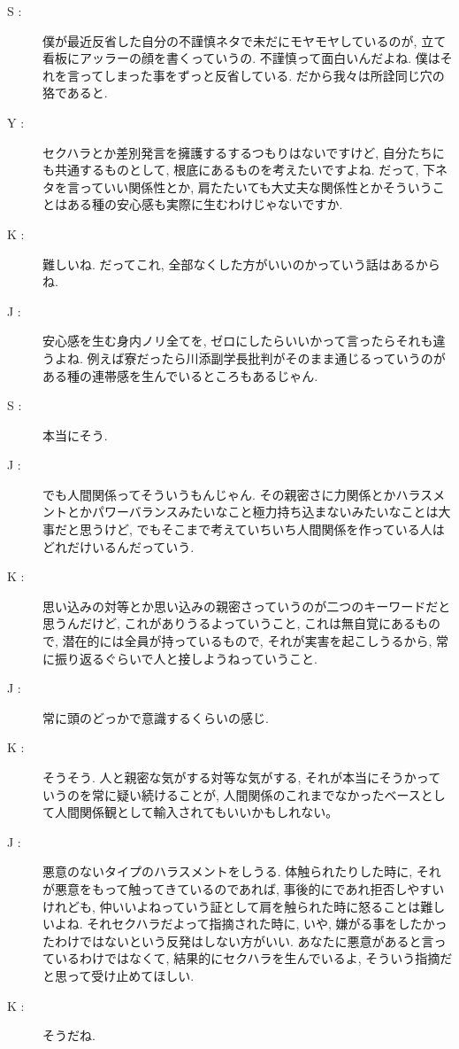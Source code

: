 \documentclass[10pt,b5jsbook,dvips,dvipdfmx,openany]{jsbook}
\theoremstyle{definition}
\begin{document}
\begin{multicols}{2}
\begin{description}
		\item[ S : ] 僕が最近反省した自分の不謹慎ネタで未だにモヤモヤしているのが, 立て看板にアッラーの顔を書くっていうの. 不謹慎って面白いんだよね. 僕はそれを言ってしまった事をずっと反省している. だから我々は所詮同じ穴の狢であると.

		\item[ Y : ] セクハラとか差別発言を擁護するするつもりはないですけど, 自分たちにも共通するものとして, 根底にあるものを考えたいですよね. だって, 下ネタを言っていい関係性とか, 肩たたいても大丈夫な関係性とかそういうことはある種の安心感も実際に生むわけじゃないですか.

		\item[ K : ] 難しいね. だってこれ, 全部なくした方がいいのかっていう話はあるからね.

		\item[ J : ] 安心感を生む身内ノリ全てを, ゼロにしたらいいかって言ったらそれも違うよね. 例えば寮だったら川添副学長批判がそのまま通じるっていうのがある種の連帯感を生んでいるところもあるじゃん.

		\item[ S : ] 本当にそう.

		\item[ J : ] でも人間関係ってそういうもんじゃん. その親密さに力関係とかハラスメントとかパワーバランスみたいなこと極力持ち込まないみたいなことは大事だと思うけど, でもそこまで考えていちいち人間関係を作っている人はどれだけいるんだっていう.

		\item[ K : ] 思い込みの対等とか思い込みの親密さっていうのが二つのキーワードだと思うんだけど, これがありうるよっていうこと, これは無自覚にあるもので, 潜在的には全員が持っているもので, それが実害を起こしうるから, 常に振り返るぐらいで人と接しようねっていうこと.

		\item[ J : ] 常に頭のどっかで意識するくらいの感じ.

		\item[ K : ] そうそう. 人と親密な気がする対等な気がする, それが本当にそうかっていうのを常に疑い続けることが, 人間関係のこれまでなかったベースとして人間関係観として輸入されてもいいかもしれない｡

		\item[ J : ] 悪意のないタイプのハラスメントをしうる. 体触られたりした時に, それが悪意をもって触ってきているのであれば, 事後的にであれ拒否しやすいけれども, 仲いいよねっていう証として肩を触られた時に怒ることは難しいよね. それセクハラだよって指摘された時に, いや, 嫌がる事をしたかったわけではないという反発はしない方がいい. あなたに悪意があると言っているわけではなくて, 結果的にセクハラを生んでいるよ, そういう指摘だと思って受け止めてほしい.

		\item[ K : ] そうだね.

		\end{description}
		\end{multicols}
\end{document}
